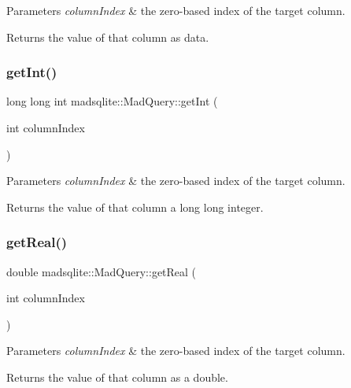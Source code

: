 \begin{DoxyParams}{Parameters}
{\em column\+Index} & the zero-\/based index of the target column. \\
\hline
\end{DoxyParams}
\begin{DoxyReturn}{Returns}
the value of that column as data. 
\end{DoxyReturn}
\hypertarget{classmadsqlite_1_1_mad_query_ab04d59c89fccfd773f77276219f4d376}{}\label{classmadsqlite_1_1_mad_query_ab04d59c89fccfd773f77276219f4d376} 
\subsubsection{\texorpdfstring{get\+Int()}{getInt()}}
{\footnotesize\ttfamily long long int madsqlite\+::\+Mad\+Query\+::get\+Int (\begin{DoxyParamCaption}\item[{int}]{column\+Index }\end{DoxyParamCaption})}


\begin{DoxyParams}{Parameters}
{\em column\+Index} & the zero-\/based index of the target column. \\
\hline
\end{DoxyParams}
\begin{DoxyReturn}{Returns}
the value of that column a long long integer. 
\end{DoxyReturn}
\hypertarget{classmadsqlite_1_1_mad_query_ab1d5375285453976e078f320c73e224f}{}\label{classmadsqlite_1_1_mad_query_ab1d5375285453976e078f320c73e224f} 
\subsubsection{\texorpdfstring{get\+Real()}{getReal()}}
{\footnotesize\ttfamily double madsqlite\+::\+Mad\+Query\+::get\+Real (\begin{DoxyParamCaption}\item[{int}]{column\+Index }\end{DoxyParamCaption})}


\begin{DoxyParams}{Parameters}
{\em column\+Index} & the zero-\/based index of the target column. \\
\hline
\end{DoxyParams}
\begin{DoxyReturn}{Returns}
the value of that column as a double. 
\end{DoxyReturn}
\hypertarget{classmadsqlite_1_1_mad_query_a63b55fe68d013c3d1fdade2391233cb9}{}\label{classmadsqlite_1_1_mad_query_a63b55fe68d013c3d1fdade2391233cb9} 
